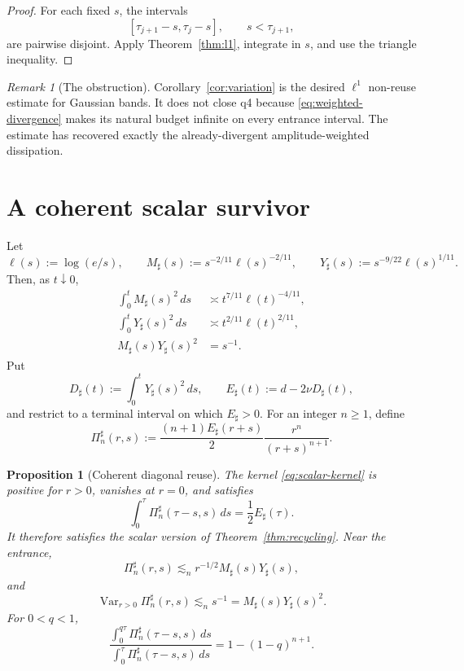 \documentclass[11pt]{article}
\newtheorem{proposition}[theorem]{Proposition}
\theoremstyle{remark}
\newtheorem{remark}[theorem]{Remark}
\newcommand{\Var}{\operatorname{Var}}
\begin{document}
\begin{proof}
For each fixed \(s\), the intervals
\[
 [\tau_{j+1}-s,\tau_j-s],
 \qquad s<\tau_{j+1},
\]
are pairwise disjoint.  Apply Theorem~\ref{thm:l1}, integrate in \(s\),
and use the triangle inequality.
\end{proof}

\begin{remark}[The obstruction]
Corollary~\ref{cor:variation} is the desired \(\ell^1\) non-reuse
estimate for Gaussian bands.  It does not close q4 because
\eqref{eq:weighted-divergence} makes its natural budget infinite on
every entrance interval.  The estimate has recovered exactly the
already-divergent amplitude-weighted dissipation.
\end{remark}

\section{A coherent scalar survivor}

Let
\[
 \ell(s):=\log(e/s),\qquad
 M_\sharp(s):=s^{-2/11}\ell(s)^{-2/11},\qquad
 Y_\sharp(s):=s^{-9/22}\ell(s)^{1/11}.
\]
Then, as \(t\downarrow0\),
\begin{align}
\label{eq:sharp-tails}
 \int_0^tM_\sharp(s)^2\,ds
 &\asymp t^{7/11}\ell(t)^{-4/11},\\
 \int_0^tY_\sharp(s)^2\,ds
 &\asymp t^{2/11}\ell(t)^{2/11},\\
\label{eq:sharp-action}
 M_\sharp(s)Y_\sharp(s)^2&=s^{-1}.
\end{align}
Put
\[
 D_\sharp(t):=\int_0^tY_\sharp(s)^2\,ds,
 \qquad
 E_\sharp(t):=d-2\nu D_\sharp(t),
\]
and restrict to a terminal interval on which \(E_\sharp>0\).
For an integer \(n\geq1\), define
\begin{equation}
\label{eq:scalar-kernel}
 \Pi_n^\sharp(r,s):=
 \frac{(n+1)E_\sharp(r+s)}2
 \frac{r^n}{(r+s)^{n+1}}.
\end{equation}

\begin{proposition}[Coherent diagonal reuse]
\label{prop:survivor}
The kernel \eqref{eq:scalar-kernel} is positive for \(r>0\), vanishes
at \(r=0\), and satisfies
\begin{equation}
\label{eq:scalar-diagonal}
 \int_0^\tau\Pi_n^\sharp(\tau-s,s)\,ds
 =\frac12E_\sharp(\tau).
\end{equation}
It therefore satisfies the scalar version of
Theorem~\ref{thm:recycling}.  Near the entrance,
\begin{equation}
\label{eq:scalar-magnitude}
 \Pi_n^\sharp(r,s)
 \lesssim_n r^{-1/2}M_\sharp(s)Y_\sharp(s),
\end{equation}
and
\begin{equation}
\label{eq:scalar-variation}
 \Var_{r>0}\Pi_n^\sharp(r,s)
 \lesssim_n s^{-1}
 =M_\sharp(s)Y_\sharp(s)^2.
\end{equation}
For \(0<q<1\),
\begin{equation}
\label{eq:reuse-fraction}
 \boxed{
 \frac{\displaystyle
  \int_0^{q\tau}\Pi_n^\sharp(\tau-s,s)\,ds}
 {\displaystyle
  \int_0^\tau\Pi_n^\sharp(\tau-s,s)\,ds}
 =1-(1-q)^{n+1}.
 }
\end{equation}
\end{proposition}
\end{document}
